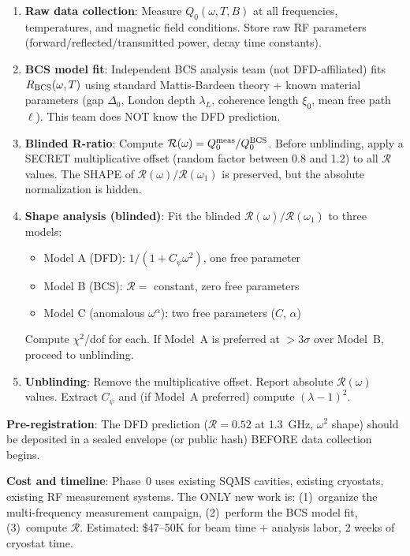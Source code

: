 \documentclass[11pt]{article}
\theoremstyle{definition}
\theoremstyle{remark}
\begin{document}
\begin{enumerate}
\item \textbf{Raw data collection}: Measure $Q_0(\omega, T, B)$
  at all frequencies, temperatures, and magnetic field conditions.
  Store raw RF parameters (forward/reflected/transmitted power,
  decay time constants).

\item \textbf{BCS model fit}: Independent BCS analysis team
  (not DFD-affiliated) fits $R_{\rm BCS}(\omega, T)$ using
  standard Mattis-Bardeen theory + known material parameters
  (gap $\Delta_0$, London depth $\lambda_L$, coherence length
  $\xi_0$, mean free path $\ell$). This team does NOT know the
  DFD prediction.

\item \textbf{Blinded R-ratio}: Compute $\mathcal{R}(\omega)
  = Q_0^{\rm meas}/Q_0^{\rm BCS}$. Before unblinding, apply
  a SECRET multiplicative offset (random factor between 0.8 and 1.2)
  to all $\mathcal{R}$ values. The SHAPE of
  $\mathcal{R}(\omega)/\mathcal{R}(\omega_1)$ is preserved,
  but the absolute normalization is hidden.

\item \textbf{Shape analysis (blinded)}: Fit the blinded
  $\mathcal{R}(\omega)/\mathcal{R}(\omega_1)$ to three models:
  \begin{itemize}[nosep]
  \item Model A (DFD): $1/(1 + C_\psi\omega^2)$, one free parameter
  \item Model B (BCS): $\mathcal{R} = $ constant, zero free parameters
  \item Model C (anomalous $\omega^\alpha$): two free parameters
    ($C$, $\alpha$)
  \end{itemize}
  Compute $\chi^2$/dof for each. If Model~A is preferred at
  $>3\sigma$ over Model~B, proceed to unblinding.

\item \textbf{Unblinding}: Remove the multiplicative offset.
  Report absolute $\mathcal{R}(\omega)$ values. Extract $C_\psi$
  and (if Model~A preferred) compute $(\lambda-1)^2$.
\end{enumerate}

\textbf{Pre-registration}: The DFD prediction ($\mathcal{R} = 0.52$
at 1.3~GHz, $\omega^2$ shape) should be deposited in a sealed
envelope (or public hash) BEFORE data collection begins.

\textbf{Cost and timeline}: Phase~0 uses existing SQMS cavities,
existing cryostats, existing RF measurement systems. The ONLY new
work is: (1)~organize the multi-frequency measurement campaign,
(2)~perform the BCS model fit, (3)~compute $\mathcal{R}$.
Estimated: \$47--50K for beam time + analysis labor, 2 weeks of
cryostat time.
\end{document}

